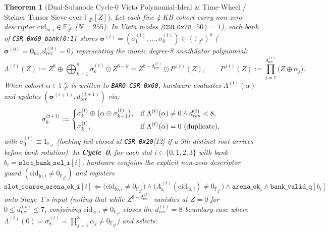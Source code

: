 \documentclass[10pt,twocolumn]{article}
\theoremstyle{spectralthm}
\newtheorem{theorem}{Theorem}[section]
\begin{document}
\begin{theorem}[Dual-Submode Cycle-0 Vieta Polynomial-Ideal \& Time-Wheel / Steiner Tensor Sieve over {$\mathbb{F}_{2^8}[Z]$}]
\label{thm:vieta}
Let each fine 4-KB cohort carry non-zero descriptor $\mathrm{cid}_{\mathrm{lo},i} \in \mathbb{F}_{2^8}^\times$ ($N = 255$). In Vieta modes ($\texttt{CSR 0x78}[50] = 1$), each bank of \texttt{CSR 0x60\_bank[0:1]} stores $\boldsymbol{\sigma}^{(t)} = (\sigma_1^{(t)}, \ldots, \sigma_8^{(t)}) \in (\mathbb{F}_{2^8})^8$ ($\boldsymbol{\sigma}^{(0)} = \mathbf{0}_{64}, d_{\mathrm{rev}}^{(0)} = 0$) representing the monic degree-8 annihilator polynomial:
\begin{equation}
\label{eq:vieta_poly}
\Lambda^{(t)}(Z) := Z^8 \oplus \bigoplus_{k=1}^8 \sigma_k^{(t)} \odot Z^{8-k}
= Z^{8 - d_{\mathrm{rev}}^{(t)}} \odot P^{(t)}(Z), \qquad
P^{(t)}(Z) := \prod_{j=1}^{d_{\mathrm{rev}}^{(t)}} \bigl(Z \oplus \alpha_j\bigr).
\end{equation}
When cohort $\alpha \in \mathbb{F}_{2^8}^\times$ is written to \texttt{BAR0 CSR 0x60}, hardware evaluates $\Lambda^{(t)}(\alpha)$ and updates $(\boldsymbol{\sigma}^{(t+1)}, d_{\mathrm{rev}}^{(t+1)})$ via:
\begin{equation}
\label{eq:vieta_ratchet}
\sigma_k^{(t+1)} :=
\begin{dcases}
\sigma_k^{(t)} \oplus \bigl(\alpha \odot \sigma_{k-1}^{(t)}\bigr), & \text{if } \Lambda^{(t)}(\alpha) \neq 0 \wedge d_{\mathrm{rev}}^{(t)} < 8,\\
\sigma_k^{(t)}, & \text{if } \Lambda^{(t)}(\alpha) = 0 \text{ (duplicate)},
\end{dcases}
\end{equation}
with $\sigma_0^{(t)} \equiv 1_{\mathbb{F}_{2^8}}$ (locking fail-closed at \texttt{CSR 0x20}[12] if a 9th distinct root arrives before bank rotation). In \textbf{Cycle~0}, for each slot $i \in \{0,1,2,3\}$ with bank $b_i = \texttt{slot\_bank\_sel\_i}[i]$, hardware conjoins the explicit non-zero descriptor guard $(\mathrm{cid}_{\mathrm{lo},i} \neq 0_{\mathbb{F}_{2^8}})$ and registers
\[
\texttt{slot\_coarse\_arena\_ok\_i}[i] \Leftarrow \bigl(\mathrm{cid}_{\mathrm{lo},i} \neq 0_{\mathbb{F}_{2^8}}\bigr) \wedge \bigl(\Lambda_{b_i}^{(t)}(\mathrm{cid}_{\mathrm{lo},i}) \neq 0_{\mathbb{F}_{2^8}}\bigr) \wedge \texttt{arena\_ok}_i \wedge \texttt{bank\_valid\_q}[b_i]
\]
onto Stage~1's input (noting that while $Z^{8 - d_{\mathrm{rev}}^{(t)}}$ vanishes at $Z=0$ for $0 \le d_{\mathrm{rev}}^{(t)} \le 7$, conjoining $\mathrm{cid}_{\mathrm{lo},i} \neq 0_{\mathbb{F}_{2^8}}$ closes the $d_{\mathrm{rev}}^{(t)} = 8$ boundary case where $\Lambda^{(t)}(0) = \sigma_8^{(t)} = \prod_{j=1}^8 \alpha_j \neq 0_{\mathbb{F}_{2^8}}$) and selects:

\end{theorem}
\end{document}
